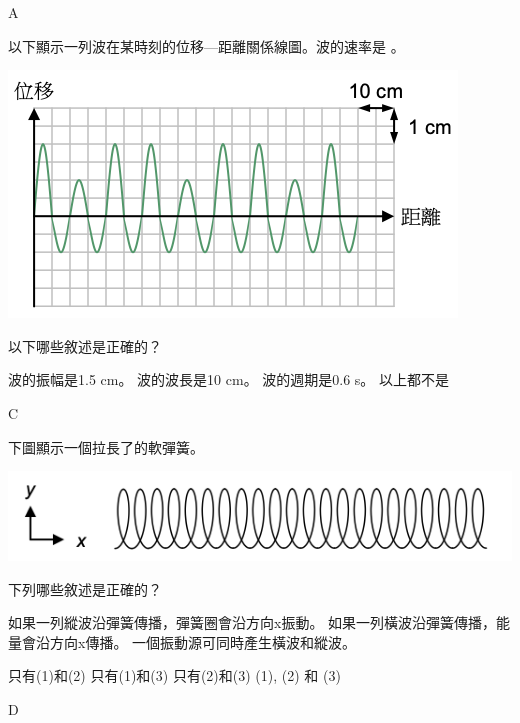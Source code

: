 {\begin{tasks}
        \task {}
    \end{tasks}

}{\mckey A}

{
    以下顯示一列波在某時刻的位移—距離關係線圖。波的速率是 。
    \par{\par\centering\includegraphics[width=.35\textwidth]{./img/ch1_earlyclass_wave_mc_2024-05-13-16-01-07.png}\par}
    以下哪些敘述是正確的？
    \begin{tasks}
        \task 波的振幅是1.5 cm。
        \task 波的波長是10 cm。
        \task 波的週期是0.6 s。
        \task 以上都不是
    \end{tasks}

}{\mckey C}

{
    下圖顯示一個拉長了的軟彈簧。
    \par{\par\centering\includegraphics[width=.4\textwidth]{./img/ch1_earlyclass_wave_mc_2024-05-13-16-02-17.png}\par}
    下列哪些敘述是正確的？
    \begin{statements}
        \task 如果一列縱波沿彈簧傳播，彈簧圈會沿方向x振動。
        \task 如果一列橫波沿彈簧傳播，能量會沿方向x傳播。
        \task 一個振動源可同時產生橫波和縱波。
    \end{statements}
    \begin{tasks}
        \task 只有(1)和(2)
        \task 只有(1)和(3)
        \task 只有(2)和(3)
        \task (1), (2) 和 (3)
    \end{tasks}

}{\mckey D}

